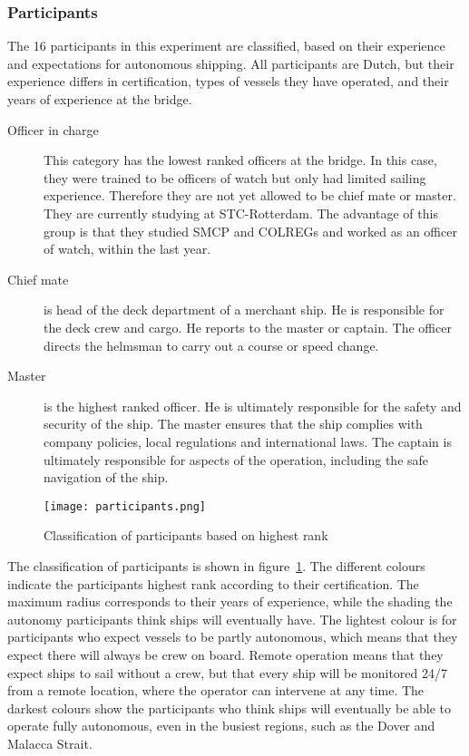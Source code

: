 \subsubsection{Participants}
The 16 participants in this experiment are classified, based on their experience and expectations for autonomous shipping. All participants are Dutch, but their experience differs in certification, types of vessels they have operated, and their years of experience at the bridge.
\begin{description}
	\item[Officer in charge] This category has the lowest ranked officers at the bridge. In this case, they were trained to be officers of watch but only had limited sailing experience. Therefore they are not yet allowed to be chief mate or master. They are currently studying at STC-Rotterdam. The advantage of this group is that they studied SMCP and COLREGs and worked as an officer of watch, within the last year.
	\item[Chief mate] is head of the deck department of a merchant ship. He is responsible for the deck crew and cargo. He reports to the master or captain. The officer directs the helmsman to carry out a course or speed change.
	\item[Master] is the highest ranked officer. He is ultimately responsible for the safety and security of the ship. The master ensures that the ship complies with company policies, local regulations and international laws. The captain is ultimately responsible for aspects of the operation, including the safe navigation of the ship.
\end{description}

\begin{figure}[h]
	\centering
	\texttt{[image: participants.png]}
	\caption{Classification of participants based on highest rank}
	\label{fig:participants}
\end{figure}

The classification of participants is shown in figure~\ref{fig:participants}. The different colours indicate the participants highest rank according to their certification. The maximum radius corresponds to their years of experience, while the shading the autonomy participants think ships will eventually have. 
The lightest colour is for participants who expect vessels to be partly autonomous, which means that they expect there will always be crew on board. Remote operation means that they expect ships to sail without a crew, but that every ship will be monitored 24/7 from a remote location, where the operator can intervene at any time. The darkest colours show the participants who think ships will eventually be able to operate fully autonomous, even in the busiest regions, such as the Dover and Malacca Strait.

